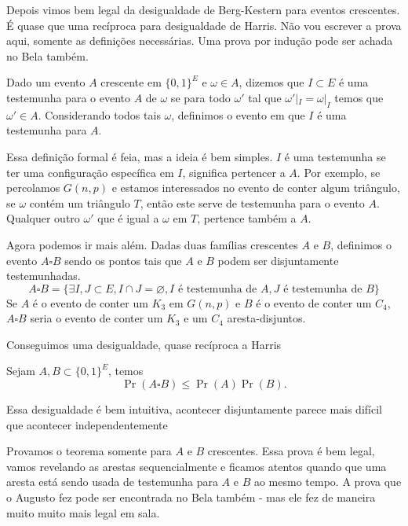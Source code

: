 Depois vimos bem legal da desigualdade de Berg-Kestern para eventos crescentes.
É quase que uma recíproca para desigualdade de Harris. Não vou
escrever a prova aqui,
somente as definições necessárias. Uma prova por indução pode ser
achada no Bela também.

\begin{definition}
	Dado um evento $A$ crescente em $\{0,1\}^E$ e $\omega \in A$,
	dizemos que $I \subset E$ é
	uma testemunha para o evento $A$ de $\omega$ se para todo $\omega'$
	tal que $\omega'|_I = \omega|_I$ temos que $\omega' \in A$.
	Considerando todos tais $\omega$, definimos o evento em que $I$ é uma
	testemunha para $A$.
\end{definition}
Essa definição formal é feia, mas a ideia é bem simples. $I$ é uma testemunha
se ter uma configuração específica em $I$, significa pertencer a $A$.
Por exemplo,
se percolamos $G(n,p)$ e estamos interessados no evento de conter
algum triângulo,
se $\omega$ contém um triângulo $T$, então este serve de testemunha para
o evento $A$. Qualquer
outro $\omega'$ que é igual a $\omega$ em $T$,
pertence também a $A$.

Agora podemos ir mais além. Dadas duas famílias crescentes $A$ e $B$,
definimos o evento $A \square B$
sendo os pontos tais que $A$ e $B$ podem ser disjuntamente testemunhadas.
\[A \square B = \{\exists I,J \subset E, I \cap J = \varnothing, I
\text{ é testemunha de } A, J \text{ é testemunha de } B \}\]
Se $A$ é o evento de conter um $K_3$ em $G(n,p)$ e $B$ é o evento de
conter um $C_4$,
$A \square B$ seria o evento de conter um $K_3$ e um $C_4$ aresta-disjuntos.

Conseguimos uma desigualdade, quase recíproca a Harris
\begin{theorem}
	\label{trm:bk}
	Sejam $A,B \subset \{0,1\}^E$, temos
	\[
		\Pr(A \square B) \leq \Pr(A)\Pr(B).
	\]
\end{theorem}
\begin{remark}
	Essa desigualdade é bem intuitiva, acontecer disjuntamente parece mais difícil
	que acontecer independentemente
\end{remark}

Provamos o teorema somente para $A$ e $B$ crescentes.
Essa prova é bem legal, vamos revelando as arestas sequencialmente e
ficamos atentos
quando que uma aresta está sendo usada de testemunha para $A$ e $B$
ao mesmo tempo.
A prova que o Augusto fez pode ser encontrada no Bela também - mas
ele fez de maneira
muito muito mais legal em sala.
